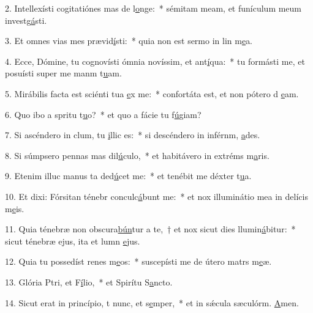 2. Intellexísti cogitatiónes mas de l\uline{o}nge:~* sémitam meam, et funículum meum investg\uline{á}sti.\par 
3. Et omnes vias mes prævid\uline{í}sti:~* quia non est sermo in lin m\uline{e}a.\par 
4. Ecce, Dómine, tu cognovísti ómnia novíssim, et ant\uline{í}qua:~* tu formásti me, et posuísti super me manm t\uline{u}am.\par 
5. Mirábilis facta est sciénti tua \uline{e}x me:~* confortáta est, et non pótero d \uline{e}am.\par 
6. Quo ibo a spritu t\uline{u}o?~* et quo a fácie tu f\uline{ú}giam?\par 
7. Si ascéndero in clum, tu \uline{i}llic es:~* si descéndero in inférnm, \uline{a}des.\par 
8. Si súmpsero pennas mas dil\uline{ú}culo,~* et habitávero in extréms m\uline{a}ris.\par 
9. Etenim illuc manus ta ded\uline{ú}cet me:~* et tenébit me déxter t\uline{u}a.\par 
10. Et dixi: Fórsitan ténebr conculc\uline{á}bunt me:~* et nox illuminátio mea in delícis m\uline{e}is.\par 
11. Quia ténebræ non obscura\uline{bún}tur a te,~† et nox sicut dies llumin\uline{á}bitur:~* sicut ténebræ ejus, ita et lumn \uline{e}jus.\par 
12. Quia tu possedíst renes m\uline{e}os:~* suscepísti me de útero matrs m\uline{e}æ.\par 
13. Glória Ptri, et F\uline{í}lio,~* et Spirítu S\uline{a}ncto.\par 
14. Sicut erat in princípio, t nunc, et s\uline{e}mper,~* et in sǽcula sæculórm. \uline{A}men.\par 
